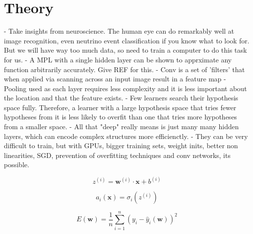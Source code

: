 \section{Theory}
\label{sec:cvn_theory}
- Take insights from neuroscience. The human eye can do remarkably well at image recognition, even neutrino event classification if
you know what to look for. But we will have way too much data, so need to train a computer to do this task for us.
- A MPL with a single hidden layer can be shown to apprximate any function arbitrarily accurately. Give REF for this.
- Conv is a set of 'filters' that when applied via scanning across an input image result in a feature map
- Pooling used as each layer requires less complexity and it is less important about the location and that the feature exists.
- Few learners search their hypothesis space fully. Therefore, a learner with a large hypothesis space that tries fewer hypotheses from it is less likely to overfit than one that tries more hypotheses from a smaller space.
- All that "deep" really means is just many many hidden layers, which can encode complex structures more efficienctly.
- They can be very difficult to train, but with GPUs, bigger training sets, weight inits, better non linearities, SGD, prevention of overfitting techniques and conv networks, its possible.

\begin{equation} %
    z^{(i)}=\boldsymbol{w}^{(i)}\cdot\boldsymbol{x}+b^{(i)}
\end{equation} %

\begin{equation} %
    a_{i}(\boldsymbol{x})=\sigma_i(z^{(i)})
\end{equation} %

\begin{equation} %
    E(\boldsymbol{w})=
    \frac{1}{n}\displaystyle\sum_{i=1}^{n}(y_{i}-
    \hat{y}_{i}(\boldsymbol{w}))^{2}
\end{equation} %

